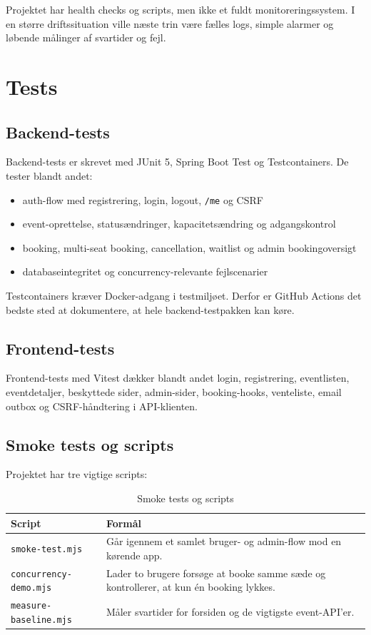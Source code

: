 \documentclass[11pt,a4paper]{article}
\newcommand{\code}[1]{\texttt{#1}}
\begin{document}
Projektet har health checks og scripts, men ikke et fuldt monitoreringssystem. I en større driftssituation ville næste trin være fælles logs, simple alarmer og løbende målinger af svartider og fejl.

\section{Tests}

\subsection{Backend-tests}

Backend-tests er skrevet med JUnit 5, Spring Boot Test og Testcontainers. De tester blandt andet:

\begin{itemize}
  \item auth-flow med registrering, login, logout, \code{/me} og CSRF
  \item event-oprettelse, statusændringer, kapacitetsændring og adgangskontrol
  \item booking, multi-seat booking, cancellation, waitlist og admin bookingoversigt
  \item databaseintegritet og concurrency-relevante fejlscenarier
\end{itemize}

Testcontainers kræver Docker-adgang i testmiljøet. Derfor er GitHub Actions det bedste sted at dokumentere, at hele backend-testpakken kan køre.

\subsection{Frontend-tests}

Frontend-tests med Vitest dækker blandt andet login, registrering, eventlisten, eventdetaljer, beskyttede sider, admin-sider, booking-hooks, venteliste, email outbox og CSRF-håndtering i API-klienten.

\subsection{Smoke tests og scripts}

Projektet har tre vigtige scripts:

\begin{table}[h]
\centering
\caption{Smoke tests og scripts}
\begin{tabularx}{\textwidth}{@{}L{4.4cm}Y@{}}
\toprule
Script & Formål \\
\midrule
\code{smoke-test.mjs} & Går igennem et samlet bruger- og admin-flow mod en kørende app. \\
\code{concurrency-demo.mjs} & Lader to brugere forsøge at booke samme sæde og kontrollerer, at kun én booking lykkes. \\
\code{measure-baseline.mjs} & Måler svartider for forsiden og de vigtigste event-API'er. \\
\bottomrule
\end{tabularx}
\end{table}
\end{document}
